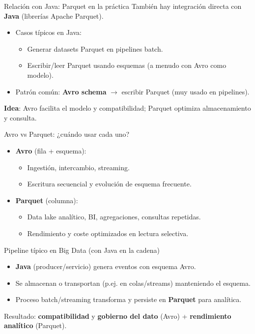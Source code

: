 \documentclass{beamer}
\begin{document}
\begin{frame}{Relación con Java: Parquet en la práctica}
También hay integración directa con \textbf{Java} (librerías Apache Parquet).

\begin{itemize}
    \item Casos típicos en Java:
    \begin{itemize}
        \item Generar datasets Parquet en pipelines batch.
        \item Escribir/leer Parquet usando esquemas (a menudo con Avro como modelo).
    \end{itemize}
    \item Patrón común: \textbf{Avro schema} $\rightarrow$ escribir Parquet (muy usado en pipelines).
\end{itemize}

\medskip
\textbf{Idea}: Avro facilita el modelo y compatibilidad; Parquet optimiza almacenamiento y consulta.
\end{frame}

\begin{frame}{Avro vs Parquet: ¿cuándo usar cada uno?}
\begin{itemize}
    \item \textbf{Avro} (fila + esquema):
    \begin{itemize}
        \item Ingestión, intercambio, streaming.
        \item Escritura secuencial y evolución de esquema frecuente.
    \end{itemize}
    \item \textbf{Parquet} (columna):
    \begin{itemize}
        \item Data lake analítico, BI, agregaciones, consultas repetidas.
        \item Rendimiento y coste optimizados en lectura selectiva.
    \end{itemize}
\end{itemize}
\end{frame}

\begin{frame}{Pipeline típico en Big Data (con Java en la cadena)}
\begin{itemize}
    \item \textbf{Java} (producer/servicio) genera eventos con esquema Avro.
    \item Se almacenan o transportan (p.ej. en colas/streams) manteniendo el esquema.
    \item Proceso batch/streaming transforma y persiste en \textbf{Parquet} para analítica.
\end{itemize}

\medskip
Resultado: \textbf{compatibilidad} y \textbf{gobierno del dato} (Avro) + \textbf{rendimiento analítico} (Parquet).
\end{frame}
\end{document}
